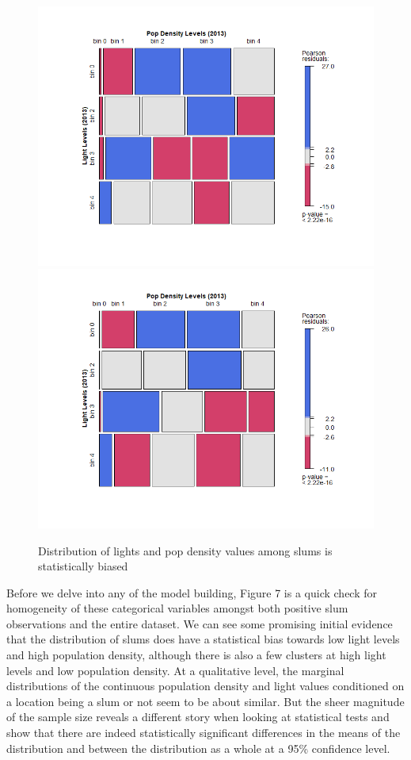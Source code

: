 \begin{figure}
    \centering
    \includegraphics[scale = 0.36]{Graphics/Total Mosaic.png}
    \includegraphics[scale = 0.36]{Graphics/Slum Mosaic.png}
    \caption{Distribution of lights and pop density values among slums is statistically biased}
    \label{fig:mosaic1}
\end{figure}

Before we delve into any of the model building, Figure 7 is a quick check for homogeneity of these categorical variables amongst both positive slum observations and the entire dataset. We can see some promising initial evidence that the distribution of slums does have a statistical bias towards low light levels and high population density, although there is also a few clusters at high light levels and low population density. At a qualitative level, the marginal distributions of the continuous population density and light values conditioned on a location being a slum or not seem to be about similar. But the sheer magnitude of the sample size reveals a different story when looking at statistical tests and show that there are indeed statistically significant differences in the means of the distribution and between the distribution as a whole at a 95\% confidence level.

